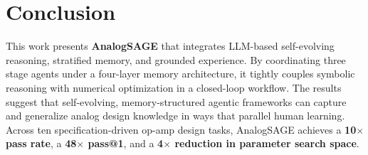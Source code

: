\section{Conclusion}

This work presents \textbf{AnalogSAGE} that integrates LLM-based self-evolving reasoning, stratified memory, and grounded experience. By coordinating three stage agents under a four-layer memory architecture, it tightly couples symbolic reasoning with numerical optimization in a closed-loop workflow. The results suggest that self-evolving, memory-structured agentic frameworks can capture and generalize analog design knowledge in ways that parallel human learning.
Across ten specification-driven op-amp design tasks, AnalogSAGE achieves a \textbf{10$\times$ pass rate}, a \textbf{ 48$\times$ pass@1}, and a \textbf{4$\times$ reduction in parameter search space}.